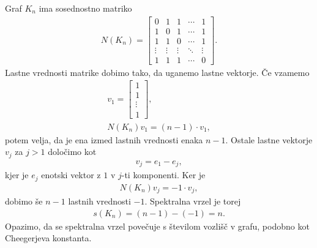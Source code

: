 \begin{primer}\label{polni-grafi-racun}
    Graf \(K_n\) ima sosednostno matriko
    \begin{align*}
        N(K_n) = \begin{bmatrix}
                     0      & 1      & 1      & \cdots & 1      \\
                     1      & 0      & 1      & \cdots & 1      \\
                     1      & 1      & 0      & \cdots & 1      \\
                     \vdots & \vdots & \vdots & \ddots & \vdots \\
                     1      & 1      & 1      & \cdots & 0
                 \end{bmatrix}.
    \end{align*}
    Lastne vrednosti matrike dobimo tako, da uganemo lastne vektorje. Če vzamemo
    \begin{align*}
        v_1 = \begin{bmatrix}
                  1      \\
                  1      \\
                  \vdots \\
                  1
              \end{bmatrix}, \\
        N(K_n) v_1 = (n-1) \cdot v_1,
    \end{align*}
    potem velja, da je ena izmed lastnih vrednosti enaka \(n-1\). Ostale lastne vektorje \(v_j\) za \(j>1\) določimo kot
    \begin{align*}
        v_j = e_1 - e_j,
    \end{align*}
    kjer je \(e_j\) enotski vektor z \(1\) v \(j\)-ti komponenti. Ker je
    \begin{align*}
        N(K_n)v_j = -1 \cdot v_j,
    \end{align*}
    dobimo še \(n-1\) lastnih vrednosti \(-1\). Spektralna vrzel je torej
    \begin{align*}
        s(K_n) = (n-1) - (-1) = n.
    \end{align*}
    Opazimo, da se spektralna vrzel povečuje s številom vozlišč v grafu, podobno kot Cheegerjeva konstanta.
\end{primer}
